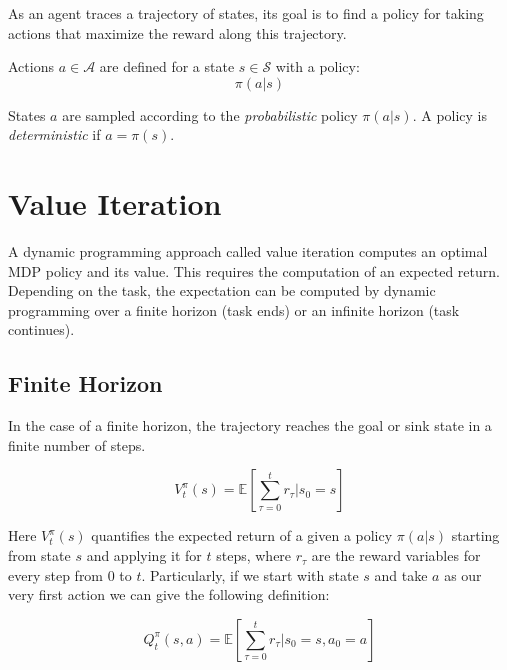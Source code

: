 \documentclass{article}
\begin{document}
As an agent traces a trajectory of states, its goal is to find a policy for taking actions that maximize the reward along this trajectory.

\begin{defn}[Policy]
Actions $a\in \mathcal{A}$ are defined for a state $s\in \mathcal{S}$ with a policy:
\[
\pi(a|s)
\]
\end{defn}
States $a$ are sampled according to the \textit{probabilistic} policy $\pi(a|s)$. A policy is \textit{deterministic} if $a = \pi(s)$.


\section{Value Iteration}

A dynamic programming approach called value iteration computes an optimal MDP policy and its value. This requires the computation of an expected return. Depending on the task, the expectation can be computed by dynamic programming over a finite horizon (task ends) or an infinite horizon (task continues).

\subsection{Finite Horizon}

In the case of a finite horizon, the trajectory reaches the goal or sink state in a finite number of steps.

\begin{defn}
\[
V^\pi_t(s) = \mathbb{E} \left[ \sum_{\tau=0}^{t}r_\tau|s_0=s \right]
\]
\end{defn}
Here $V^\pi_t(s)$ quantifies the expected return of a given a policy $\pi(a|s)$ starting from state $s$ and applying it for $t$ steps, where $r_\tau$ are the reward variables for every step from $0$ to $t$. Particularly, if we start with state $s$ and take $a$ as our very first action we can give the following definition:

\begin{defn}
\[
Q^\pi_t(s, a) = \mathbb{E} \left[ \sum_{\tau=0}^{t}r_\tau|s_0=s,a_0=a \right]
\]
\end{defn}
\end{document}

